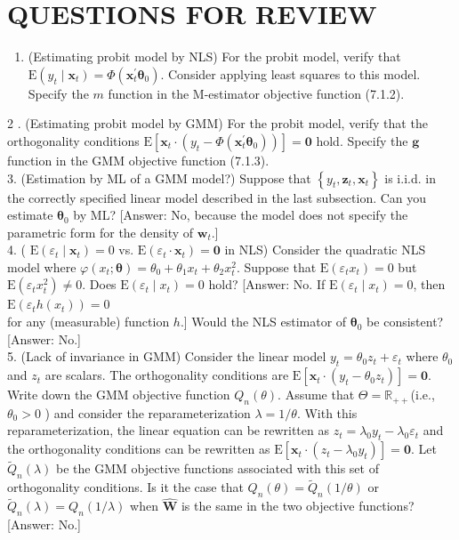 \documentclass[10pt]{article}
\begin{document}
\section*{QUESTIONS FOR REVIEW}
\begin{enumerate}
  \item (Estimating probit model by NLS) For the probit model, verify that $\mathrm{E}\left(y_{t} \mid\right. \left.\mathbf{x}_{t}\right)=\Phi\left(\mathbf{x}_{t}^{\prime} \boldsymbol{\theta}_{0}\right)$. Consider applying least squares to this model. Specify the $m$ function in the M-estimator objective function (7.1.2).
\end{enumerate}

2 . (Estimating probit model by GMM) For the probit model, verify that the orthogonality conditions $\mathrm{E}\left[\mathbf{x}_{t} \cdot\left(y_{t}-\Phi\left(\mathbf{x}_{t}^{\prime} \boldsymbol{\theta}_{0}\right)\right)\right]=\mathbf{0}$ hold. Specify the $\mathbf{g}$ function in the GMM objective function (7.1.3).\\
3. (Estimation by ML of a GMM model?) Suppose that $\left\{y_{t}, \mathbf{z}_{t}, \mathbf{x}_{t}\right\}$ is i.i.d. in the correctly specified linear model described in the last subsection. Can you estimate $\boldsymbol{\theta}_{0}$ by ML? [Answer: No, because the model does not specify the parametric form for the density of $\mathbf{w}_{t}$.]\\
4. ( $\mathrm{E}\left(\varepsilon_{t} \mid \mathbf{x}_{t}\right)=0$ vs. $\mathrm{E}\left(\varepsilon_{t} \cdot \mathbf{x}_{t}\right)=\mathbf{0}$ in NLS) Consider the quadratic NLS model where $\varphi\left(x_{t} ; \boldsymbol{\theta}\right)=\theta_{0}+\theta_{1} x_{t}+\theta_{2} x_{t}^{2}$. Suppose that $\mathrm{E}\left(\varepsilon_{t} x_{t}\right)=0$ but $\mathrm{E}\left(\varepsilon_{t} x_{t}^{2}\right) \neq 0$. Does $\mathrm{E}\left(\varepsilon_{t} \mid x_{t}\right)=0$ hold? [Answer: No. If $\mathrm{E}\left(\varepsilon_{t} \mid x_{t}\right)=0$, then $\mathrm{E}\left(\varepsilon_{t} h\left(x_{t}\right)\right)=0$\\
for any (measurable) function $h$.] Would the NLS estimator of $\boldsymbol{\theta}_{0}$ be consistent? [Answer: No.]\\
5. (Lack of invariance in GMM) Consider the linear model $y_{t}=\theta_{0} z_{t}+\varepsilon_{t}$ where $\theta_{0}$ and $z_{t}$ are scalars. The orthogonality conditions are $\mathrm{E}\left[\mathbf{x}_{t} \cdot\left(y_{t}-\theta_{0} z_{t}\right)\right]=\mathbf{0}$. Write down the GMM objective function $Q_{n}(\theta)$. Assume that $\Theta=\mathbb{R}_{++}$(i.e., $\theta_{0}>0$ ) and consider the reparameterization $\lambda=1 / \theta$. With this reparameterization, the linear equation can be rewritten as $z_{t}=\lambda_{0} y_{t}-\lambda_{0} \varepsilon_{t}$ and the orthogonality conditions can be rewritten as $\mathrm{E}\left[\mathbf{x}_{t} \cdot\left(z_{t}-\lambda_{0} y_{t}\right)\right]=\mathbf{0}$. Let $\widetilde{Q}_{n}(\lambda)$ be the GMM objective functions associated with this set of orthogonality conditions. Is it the case that $Q_{n}(\theta)=\widetilde{Q}_{n}(1 / \theta)$ or $\widetilde{Q}_{n}(\lambda)=Q_{n}(1 / \lambda)$ when $\widehat{\mathbf{W}}$ is the same in the two objective functions? [Answer: No.]
\end{document}
